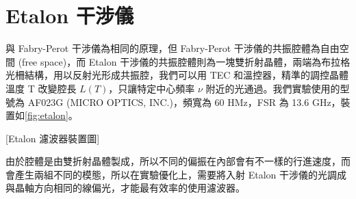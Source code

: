 \documentclass[class=NCU_thesis, crop=false]{standalone}
\begin{document}
\chapter{Etalon 干涉儀}
\label{chap:etalon}
與 Fabry-Perot 干涉儀為相同的原理，但 Fabry-Perot 干涉儀的共振腔體為自由空間 (free space)，而 Etalon 干涉儀的共振腔體則為一塊雙折射晶體，兩端為布拉格光柵結構，用以反射光形成共振腔，我們可以用 TEC 和溫控器，精準的調控晶體溫度 T 改變腔長 $L(T)$，只讓特定中心頻率 $\nu$ 附近的光通過。我們實驗使用的型號為 AF023G (MICRO OPTICS, INC.)，頻寬為 60 HMz，FSR 為 13.6 GHz，裝置如\cref{fig:etalon}。

[Etalon 濾波器裝置圖]

由於腔體是由雙折射晶體製成，所以不同的偏振在內部會有不一樣的行進速度，而會產生兩組不同的模態，所以在實驗優化上，需要將入射 Etalon 干涉儀的光調成與晶軸方向相同的線偏光，才能最有效率的使用濾波器。
\end{document}
